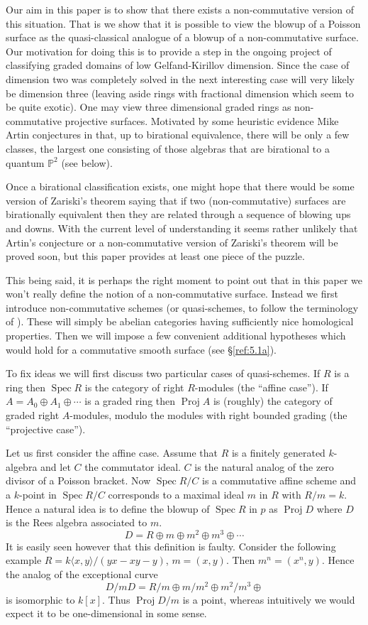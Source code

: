 \documentclass{amsproc}
\def \PP{{\mathbb P}}
\def\Spec{\operatorname {Spec}}
\def\Proj{\operatorname {Proj}}
\theoremstyle{definition}
\theoremstyle{remark}
\numberwithin{equation}{section}
\numberwithin{table}{section}
\numberwithin{figure}{section}
\begin{document}
Our aim in this paper is to show that there exists a non-commutative
version of this situation. That is we show that it is possible to view
the blowup of a Poisson surface as the quasi-classical analogue of a
blowup of a non-commutative surface.
Our motivation for doing this is to provide a step in the ongoing project
of classifying graded domains of low Gelfand-Kirillov dimension. Since 
the case of  dimension two was  completely solved in
\cite{Staf5} the next interesting case will very likely be
dimension three (leaving aside  rings with fractional
dimension which seem to be quite exotic).
 One may view three dimensional graded rings as non-commutative
 projective  surfaces. Motivated by some heuristic evidence Mike Artin 
 conjectures in \cite{Ar2} 
that, up to birational equivalence, there will
be only a few classes, the largest one consisting of those
algebras that are birational to a quantum $\PP^2$ (see below).

Once a birational classification exists, one might hope that there
would be some version of Zariski's theorem saying that if two
(non-commutative) surfaces are birationally equivalent then they are
related through a sequence of blowing ups and downs.  With the current
level of understanding it seems rather unlikely that Artin's
conjecture or a non-commutative version of Zariski's theorem will be
proved soon, but this paper provides at least one piece of the puzzle.


This being said, it is perhaps the right moment to point out that in this
paper we won't really define 
the notion of a non-commutative surface. Instead we first introduce
non-commutative  schemes (or quasi-schemes, to follow the
terminology of \cite{rosenberg}). These will simply be abelian categories
having sufficiently nice homological properties.  Then we will impose a few
convenient additional hypotheses which would hold for a commutative
smooth surface (see \S\ref{ref:5.1a}).

To fix ideas we will first discuss two particular cases of
quasi-schemes. If $R$ is a ring then $\Spec R$ is the category
of  right $R$-modules (the
``affine case''). 
If $A=A_0\oplus A_1\oplus\cdots$ is a graded ring then $\Proj A$ is (roughly) 
the category of graded right $A$-modules, modulo
the modules with right bounded grading (the ``projective case'').

Let us first consider the affine case. Assume that $R$ is a finitely
generated  $k$-algebra and let $C$ the commutator ideal. $C$ is the
natural analog of the zero divisor of a Poisson bracket.
Now $\Spec R/C$ is a
commutative affine scheme and a $k$-point in $\Spec R/C$ corresponds to
a maximal ideal  $m$ in $R$ with $R/m=k$. Hence a natural idea is to
define the blowup of $\Spec R$ in $p$ as  $\Proj D$  where $D$ is
the Rees  algebra  associated to $m$.
\[
D=R\oplus m\oplus m^2\oplus m^3\oplus\cdots
\]
It is easily seen however that this definition is faulty. Consider the
following example   \cite{Ar2} $R=k\langle x,y\rangle/(yx-xy-y)$,
$m=(x,y)$. Then $m^n=(x^n,y)$. Hence the analog of the
exceptional curve
\[
D/mD=R/m\oplus m/m^2\oplus m^2/m^3\oplus
\]
is isomorphic to $k[x]$. Thus  $\Proj D/m$ is a point, whereas intuitively we
would expect it to be one-dimensional in some sense.
\end{document}
